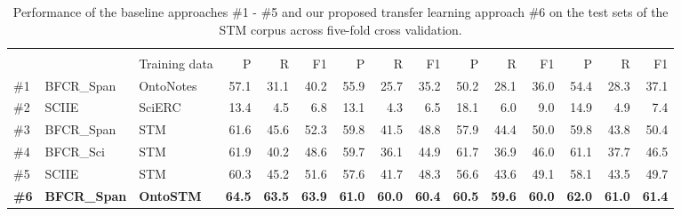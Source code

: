 \documentclass[runningheads]{llncs}
\begin{document}
\begin{table}[tb]
\centering
\small
\caption{Performance of the baseline approaches \#1 - \#5 and our proposed transfer learning approach \#6 on the test sets of the STM corpus across five-fold cross validation.}
\label{tab:coref_results}
\begin{tabular}{lll|rrr|rrr|rrr|rrr}
  &           &                & \multicolumn{3}{c}{} & \multicolumn{3}{c}{} & \multicolumn{3}{c}{} & \multicolumn{3}{c}{} \\
  &           & Training data  & P      & R      & F1     & P      & R     & F1    & P       & R      & F1     & P       & R      & F1     \\ \hline
\#1 & BFCR\_Span & OntoNotes                                                  & 57.1   & 31.1   & 40.2  & 55.9   & 25.7  & 35.2  & 50.2    & 28.1   & 36.0   & 54.4    & 28.3   & 37.1   \\
\#2 & SCIIE     & SciERC                                                     & 13.4   & 4.5    & 6.8   & 13.1   & 4.3   & 6.5   & 18.1    & 6.0    & 9.0    & 14.9    & 4.9    & 7.4    \\ \hline
\#3 & BFCR\_Span & STM                                                        
& 61.6	& 45.6	& 52.3 & 59.8	& 41.5	& 48.8 & 57.9	& 44.4	& 50.0 & 59.8	& 43.8	& 50.4 \\
\#4 & BFCR\_Sci  & STM                                                        
& 61.9	& 40.2	& 48.6 & 59.7	& 36.1	& 44.9 & 61.7	& 36.9	& 46.0 & 61.1	& 37.7	& 46.5 \\
\#5 & SCIIE     & STM                                                        & 60.3   & 45.2   & 51.6  & 57.6   & 41.7  & 48.3  & 56.6    & 43.6   & 49.1   & 58.1    & 43.5   & 49.7   \\ \hline
\textbf{\#6} & \textbf{BFCR\_Span} & \textbf{OntoSTM}
& \textbf{64.5}	& \textbf{63.5}	& \textbf{63.9} & \textbf{61.0}	& \textbf{60.0}	& \textbf{60.4} & \textbf{60.5}	& \textbf{59.6}	& \textbf{60.0} & \textbf{62.0}	& \textbf{61.0}	& \textbf{61.4} 
\end{tabular}
\vspace{-1em}
\end{table}
\end{document}

